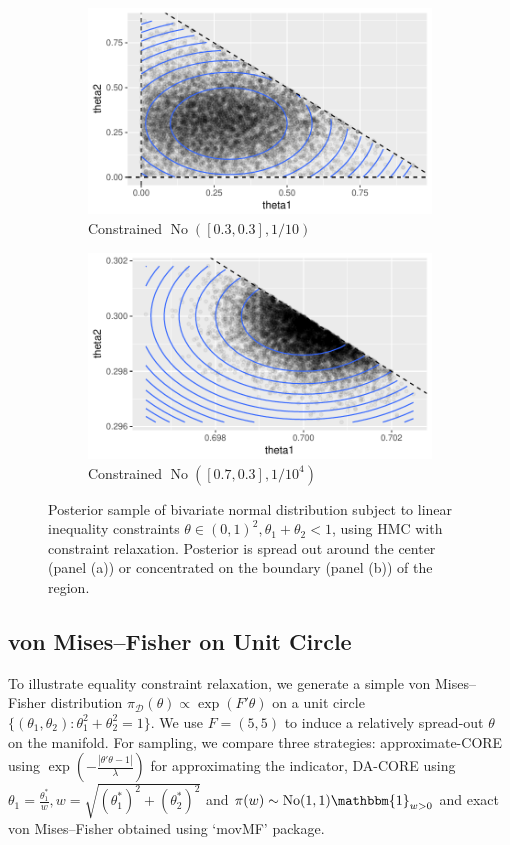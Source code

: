 \documentclass[10pt,fleqn]{article}
\newcommand{\mc}[1]{\mathcal{#1}}
\DeclareMathOperator{\No}{No}
\DeclareMathOperator{\1}{\mathbbm{1}}
\begin{document}
\begin{figure}[H]
\begin{subfigure}[b]{0.45\textwidth}
\includegraphics[width=1\textwidth]{linear_inequal_1}
\caption{Constrained $\No([0.3,0.3],1/{10})$}
\end{subfigure}
\begin{subfigure}[b]{0.45\textwidth}
\includegraphics[width=1\textwidth]{linear_inequal_2}
\caption{Constrained $\No([0.7,0.3],1/{10^4})$}
\end{subfigure}
\caption{Posterior sample of bivariate normal distribution subject to linear inequality constraints $\theta\in(0,1)^2,\theta_1+\theta_2<1$, using HMC with  constraint relaxation. Posterior is spread out around the center (panel (a)) or concentrated on the boundary (panel (b)) of the region.}
\label{linear_inequality}
\end{figure}

\subsection{von Mises--Fisher on Unit Circle}
To illustrate equality constraint relaxation, we generate a simple von Mises--Fisher distribution $\pi_{\mc D}(\theta) \propto \exp(F'\theta)$ on a unit circle $\{(\theta_1,\theta_2):\theta_1^2+\theta_2^2=1\}$. We use $F=(5,5)$ to induce a relatively spread-out  $\theta$ on the manifold.
For sampling,
we compare three strategies: approximate-CORE using $\exp(-\frac{|\theta'\theta -1|}{\lambda})$ for approximating the indicator, DA-CORE
using $\theta_1 = \frac{\theta_1^*}{w}, w= \sqrt{(\theta_1^*)^2+ (\theta_2^*)^2}$ and $\pi(w)\sim \No(1,1)\mathbbm{1}_{w>0}$ and  exact  von Mises--Fisher obtained using `movMF' package.
\end{document}
